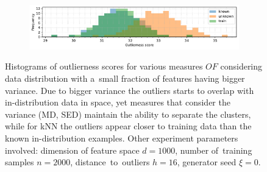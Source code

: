 \begin{figure}[t]
\begin{subfigure}[b]{\textwidth}
        \includegraphics[width=\textwidth]{images/variances/hists/hist-variances-n_varied_0.20-variance_3.00-distance_16-outliers_varied_False-model_SED-seed_0.pdf}
        \label{fig:hists-variances-sed}
    \end{subfigure}
    \caption{Histograms of outlierness scores for various measures $OF$ considering data distribution with a~small fraction of features having bigger variance. Due to bigger variance the outliers starts to overlap with in-distribution data in space, yet measures that consider the variance (MD, SED) maintain the ability to separate the clusters, while for kNN the outliers appear closer to training data than the known in-distribution examples. Other experiment parameters involved: dimension of feature space $d = 1000$, number of~training samples $n = 2000$, distance~to~outliers $h = 16$, generator seed $\xi = 0$.}
    \label{fig:hists-variances}
\end{figure}

